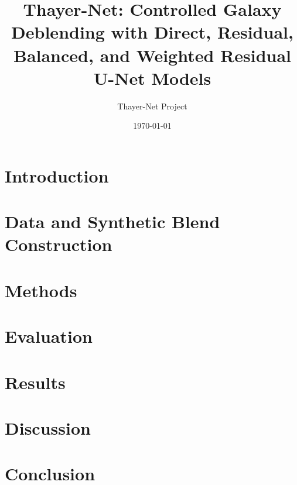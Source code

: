 \documentclass[11pt]{article}
\title{Thayer-Net: Controlled Galaxy Deblending with Direct, Residual, Balanced, and Weighted Residual U-Net Models}
\author{Thayer-Net Project}
\date{\today}
\begin{document}
\maketitle

\begin{abstract}

\end{abstract}

\section{Introduction}


\section{Data and Synthetic Blend Construction}


\section{Methods}


\section{Evaluation}


\section{Results}


\section{Discussion}


\section{Conclusion}




\end{document}
